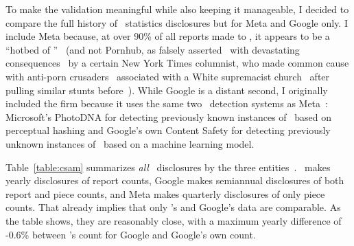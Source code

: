 To make the validation meaningful while also keeping it manageable, I decided to
compare the full history of \CSAM\ statistics disclosures but for Meta and
Google only. I include Meta because, at over 90\% of all reports made to \NCMEC,
it appears to be a ``hotbed of \CSAM''~\cite{Hitt2021} (and not Pornhub, as
falsely asserted~\cite{Brown2020,Grant2020} with devastating
consequences~\cite{Celarier2021,Dickson2020,Harris2021,Stoya2021,GagliardoSilver2021}
by a certain New York Times columnist, who made common cause with anti-porn
crusaders~\cite{Hitt2020a} associated with a White supremacist
church~\cite{Halley2021,ProducerX2020} after pulling similar stunts
before~\cite{Bass2014,Brown2019,Dickson2014,Martin2012,Masnick2017,McCormack2012,Talusan2017}).
While Google is a distant second, I originally included the firm because it uses
the same two \CSAM\ detection systems as Meta~\cite{Allen2011,Davis2018}:
Microsoft's PhotoDNA for detecting previously known instances of \CSAM\ based on
perceptual hashing and Google's own Content Safety \API{} for detecting
previously unknown instances of \CSAM\ based on a machine learning model.

Table~\ref{table:csam} summarizes \emph{all} \CSAM\ disclosures by the three
entities~\cite{NcmecByPlatform2019,NcmecByPlatform2020,NcmecByPlatform2021}.
\NCMEC\ makes yearly disclosures of report counts, Google makes semiannual
disclosures of both report and piece counts, and Meta makes quarterly
disclosures of only piece counts. That already implies that only \NCMEC's and
Google's data are comparable. As the table shows, they are reasonably close,
with a maximum yearly difference of -0.6\% between \NCMEC's count for Google and
Google's own count.

